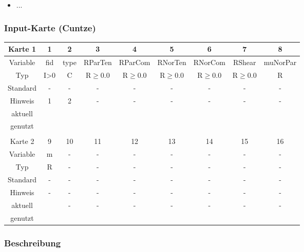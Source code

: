 \documentclass[11pt,titlepage,listof=totoc,bibliography=totoc,twoside]{scrreprt}
\begin{document}
{{\begin{itemize}
\item ...
\end{itemize}

\newpage

\subsubsection{Input-Karte (Cuntze)}

\begin{table}[htbp]
\centering
\begin{tabularx}{\textwidth}{cCCCCCCCC}
\toprule
Karte 1	& 1		& 2		& 3		& 4		& 5		& 6		& 7		& 8		\\
\midrule
Variable& fid		& type		& RParTen	& RParCom	& RNorTen	& RNorCom	& RShear	& muNorPar	\\
Typ	& I>0		& C		& R$\ge$0.0	& R$\ge$0.0	& R$\ge$0.0	& R$\ge$0.0	& R$\ge$0.0	& R		\\
Standard& -		& -		& -		& -		& -		& -		& -		& -		\\
Hinweis	& 1		& 2		& -		& -		& -		& -		& -		& -		\\
aktuell	& 	& 	& 	& 	& 	& 	& 	& 	\\
genutzt \\
\\
Karte 2	& 9		& 10		& 11		& 12		& 13		& 14		& 15		& 16		\\
\midrule
Variable& m		& -		& - 		& -		& -		& -		& -		& -		\\
Typ	& R		& -		& -		& -		& -		& -		& -		& -		\\
Standard& -		& -		& -		& -		& -		& -		& -		& -		\\
Hinweis	& -		& -		& -		& -		& -		& -		& -		& -		\\
aktuell	& 	& 	& 	& 	& \multirow{2}{*}{-}	& 	& 	& 	\\
genutzt \\
\bottomrule
\end{tabularx}
\end{table}

\subsubsection{Beschreibung}

}}
\end{document}

